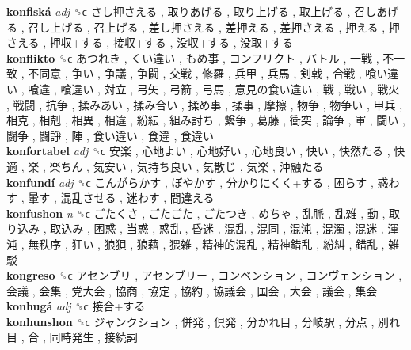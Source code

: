 \textbf{konfiská} \emph{adj}  ␝ϲ   さし押さえる ,  取りあげる ,  取り上げる ,  取上げる ,  召しあげる ,  召し上げる ,  召上げる ,  差し押さえる ,  差押える ,  差押さえる ,  押える ,  押さえる ,  押収+する ,  接収+する ,  没収+する ,  没取+する   \\
\textbf{konflikto} ␝ϲ   あつれき ,  くい違い ,  もめ事 ,  コンフリクト ,  バトル ,  一戦 ,  不一致 ,  不同意 ,  争い ,  争議 ,  争闘 ,  交戦 ,  修羅 ,  兵甲 ,  兵馬 ,  剣戟 ,  合戦 ,  喰い違い ,  喰違 ,  喰違い ,  対立 ,  弓矢 ,  弓箭 ,  弓馬 ,  意見の食い違い ,  戦 ,  戦い ,  戦火 ,  戦闘 ,  抗争 ,  揉みあい ,  揉み合い ,  揉め事 ,  揉事 ,  摩擦 ,  物争 ,  物争い ,  甲兵 ,  相克 ,  相剋 ,  相異 ,  相違 ,  紛紜 ,  組み討ち ,  繋争 ,  葛藤 ,  衝突 ,  論争 ,  軍 ,  闘い ,  闘争 ,  闘諍 ,  陣 ,  食い違い ,  食違 ,  食違い   \\
\textbf{konfortabel} \emph{adj}  ␝ϲ   安楽 ,  心地よい ,  心地好い ,  心地良い ,  快い ,  快然たる ,  快適 ,  楽 ,  楽ちん ,  気安い ,  気持ち良い ,  気散じ ,  気楽 ,  沖融たる   \\
\textbf{konfundí} \emph{adj}  ␝ϲ   こんがらかす ,  ぼやかす ,  分かりにくく+する ,  困らす ,  惑わす ,  暈す ,  混乱させる ,  迷わす ,  間違える   \\
\textbf{konfushon} \emph{n}  ␝ϲ   ごたくさ ,  ごたごた ,  ごたつき ,  めちゃ ,  乱脈 ,  乱雑 ,  動 ,  取り込み ,  取込み ,  困惑 ,  当惑 ,  惑乱 ,  昏迷 ,  混乱 ,  混同 ,  混沌 ,  混濁 ,  混迷 ,  渾沌 ,  無秩序 ,  狂い ,  狼狽 ,  狼藉 ,  猥雑 ,  精神的混乱 ,  精神錯乱 ,  紛糾 ,  錯乱 ,  雑駁   \\
\textbf{kongreso} ␝ϲ   アセンブリ ,  アセンブリー ,  コンベンション ,  コンヴェンション ,  会議 ,  会集 ,  党大会 ,  協商 ,  協定 ,  協約 ,  協議会 ,  国会 ,  大会 ,  議会 ,  集会   \\
\textbf{konhugá} \emph{adj}  ␝ϲ   接合+する   \\
\textbf{konhunshon} ␝ϲ   ジャンクション ,  併発 ,  倶発 ,  分かれ目 ,  分岐駅 ,  分点 ,  別れ目 ,  合 ,  同時発生 ,  接続詞   \\
